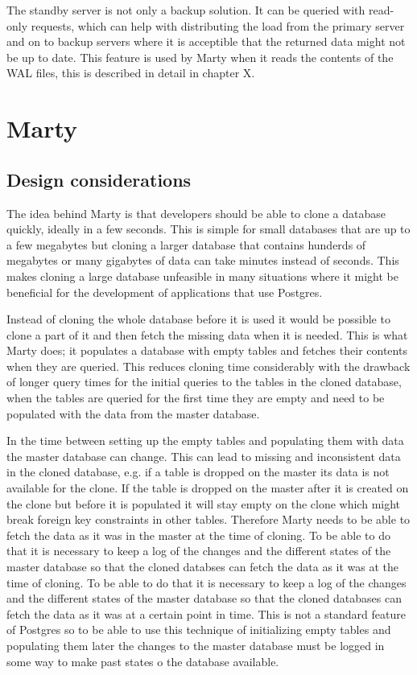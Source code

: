 \documentclass[a4paper,12pt,twoside,BCOR=10mm]{scrbook}
\begin{document}
The standby server is not only a backup solution. It can be queried with read-only requests, which can help with distributing the load from the primary server and on to backup servers where it is acceptible that the returned data might not be up to date. This feature is used by Marty when it reads the contents of the WAL files, this is described in detail in chapter X.


\chapter{Marty}

\section{Design considerations}
The idea behind Marty is that developers should be able to clone a database quickly, ideally in a few seconds. This is simple for small databases that are up to a few megabytes but cloning a larger database that contains hunderds of megabytes or many gigabytes of data can take minutes instead of seconds. This makes cloning a large database unfeasible in many situations where it might be beneficial for the development of applications that use Postgres.

Instead of cloning the whole database before it is used it would be possible to clone a part of it and then fetch the missing data when it is needed. This is what Marty does; it populates a database with empty tables and fetches their contents when they are queried. This reduces cloning time considerably with the drawback of longer query times for the initial queries to the tables in the cloned database, when the tables are queried for the first time they are empty and need to be populated with the data from the master database.

In the time between setting up the empty tables and populating them with data the master database can change. This can lead to missing and inconsistent data in the cloned database, e.g. if a table is dropped on the master its data is not available for the clone. If the table is dropped on the master after it is created on the clone but before it is populated it will stay empty on the clone which might break foreign key constraints in other tables. Therefore Marty needs to be able to fetch the data as it was in the master at the time of cloning. To be able to do that it is necessary to keep a log of the changes and the different states of the master database so that the cloned databses can fetch the data as it was at the time of cloning. To be able to do that it is necessary to keep a log of the changes and the different states of the master database so that the cloned databases can fetch the data as it was at a certain point in time. This is not a standard feature of Postgres so to be able to use this 
technique of initializing empty tables and populating them later the changes to the master database must be logged in some way to make past states o the database available.
\end{document}
